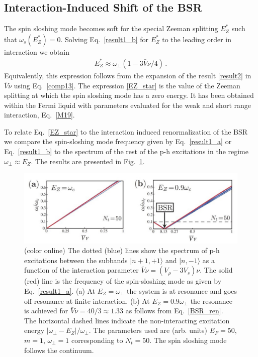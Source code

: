 \subsection{Interaction-Induced Shift of the BSR}
\label{sec:Interaction}

The spin sloshing mode becomes soft for the special Zeeman splitting $E_Z^*$ such that $\omega_s(E_Z^*) =0$.
Solving Eq.~\eqref{result1_b} for $E_Z^*$ to the leading order in interaction we obtain 
\begin{align}\label{EZ_star}
E_Z^* \approx \omega_{\perp}( 1 - 3 \bar{V} \nu/4 )\, .
\end{align}
Equivalently, this expression follows from the expansion of the result \eqref{result2} in $\bar{V} \nu$ using Eq.~\eqref{comp13}.
The expression \eqref{EZ_star} is the value of the Zeeman splitting at which the spin sloshing mode has a zero energy.
It has been obtained within the Fermi liquid with parameters evaluated for the weak and short range interaction, Eq.~\eqref{M19}.

To relate Eq.~\eqref{EZ_star} to the interaction induced renormalization of the BSR we compare the spin-sloshing mode frequency given by Eq.~\eqref{result1_a} or Eq.~\eqref{result1_b} to the spectrum of the rest of the p-h excitations in the regime $\omega_{\perp} \approx E_Z$.
The results are presented in Fig.~\ref{fig:res_comp}.
 
\begin{figure}[h]
\begin{center}
\includegraphics[width=0.7\columnwidth]{fig6.jpg}
\caption{ (color online) The dotted (blue) lines show the spectrum of p-h excitations between the subbands $|n+1,+1\rangle$ and $|n,-1\rangle$ as a function of the interaction parameter $\bar{V} \nu =(V_{\rho} - 3 V_s) \nu$.
The solid (red) line is the frequency of the spin-sloshing mode as given by Eq.~\eqref{result1_a}.
(a) At $E_Z = \omega_{\perp}$ the system is at resonance and goes off resonance at finite interaction.
(b) At $E_Z = 0.9\omega_{\perp}$ the resonance is achieved for 
$\bar{V} \nu = 40/3 \approx 1.33$ as follows from Eq.~\eqref{BSR_ren}.
The horizontal dashed lines indicate the non-interacting excitation energy  $|\omega_{\perp} - E_Z|/\omega_{\perp}$.
The parameters used are (arb. units) $E_F = 50$,  $m=1$, $\omega_{\perp} = 1$ corresponding to $N_t = 50$. 
The spin sloshing mode follows the continuum.\cite{Iqbal}}
\label{fig:res_comp}
\end{center}
\end{figure}

